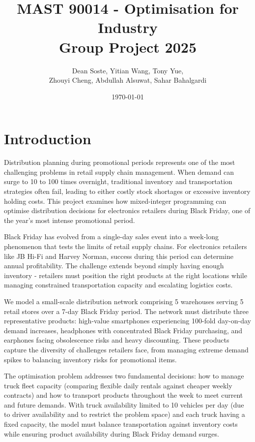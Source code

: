 \documentclass[a4paper,12pt]{article}
\title{MAST 90014 - Optimisation for Industry \\ Group Project 2025}
\author{{Dean Soste}, {Yitian Wang}, {Tony Yue}, \\
{Zhouyi Cheng}, {Abdullah Alsuwat}, {Sahar Bahalgardi}
}
\date{\today}
\begin{document}
\maketitle




\section{Introduction}\label{sec:introduction}

Distribution planning during promotional periods represents one of the most challenging problems in retail supply chain management.
When demand can surge to 10 to 100 times overnight, traditional inventory and transportation strategies often fail, leading to either costly stock shortages or excessive inventory holding costs.
This project examines how mixed-integer programming can optimise distribution decisions for electronics retailers during Black Friday, one of the year's most intense promotional period.

Black Friday has evolved from a single-day sales event into a week-long phenomenon that tests the limits of retail supply chains.
For electronics retailers like JB Hi-Fi and Harvey Norman, success during this period can determine annual profitability.
The challenge extends beyond simply having enough inventory - retailers must position the right products at the right locations while managing constrained transportation capacity and escalating logistics costs.

We model a small-scale distribution network comprising 5 warehouses serving 5 retail stores over a 7-day Black Friday period.
The network must distribute three representative products: high-value smartphones experiencing 100-fold day-on-day demand increases, headphones with concentrated Black Friday purchasing, and earphones facing obsolescence risks and heavy discounting.
These products capture the diversity of challenges retailers face, from managing extreme demand spikes to balancing inventory risks for promotional items.

The optimisation problem addresses two fundamental decisions: how to manage truck fleet capacity (comparing flexible daily rentals against cheaper weekly contracts) and how to transport products throughout the week to meet current and future demands.
With truck availability limited to 10 vehicles per day (due to driver availability and to restrict the problem space) and each truck having a fixed capacity, the model must balance transportation against inventory costs while ensuring product availability during Black Friday demand surges.
\end{document}

